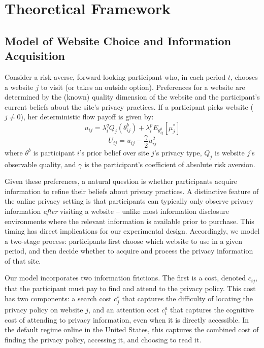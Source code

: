 \documentclass[12pt]{article}
\theoremstyle{definition}
\theoremstyle{remark}
\begin{document}

\section{Theoretical Framework}\label{sec:model_hypotheses}

\subsection{Model of Website Choice and Information Acquisition}\label{sec:participant_model}
Consider a risk-averse, forward-looking participant who, in each period $t$, chooses a website $j$ to visit (or takes an outside option). Preferences for a website are determined by the (known) quality dimension of the website and the participant's current beliefs about the site's privacy practices. If a participant picks website ($j \neq 0$), her deterministic flow payoff is given by:
\begin{equation}\label{eq:utility}
    u_{ij} = \lambda^q_i Q_j(\theta^b_{ij}) + \lambda^p_i E_{\theta^b_{ij}}[\mu^*_j]
\end{equation}
\begin{equation}
    U_{ij} = u_{ij} - \frac{\gamma}{2} u^2_{ij}
\end{equation}
where $\theta^b$ is participant $i$'s prior belief over site $j$'s privacy type, $Q_j$ is website $j$'s observable quality, and $\gamma$ is the participant's coefficient of absolute risk aversion.
 
Given these preferences, a natural question is whether participants acquire information to refine their beliefs about privacy practices. A distinctive feature of the online privacy setting is that participants can typically only observe privacy information \emph{after} visiting a website -- unlike most information disclosure environments where the relevant information is available prior to purchase. This timing has direct implications for our experimental design. Accordingly, we model a two-stage process: participants first choose which website to use in a given period, and then decide whether to acquire and process the privacy information of that site.

Our model incorporates two information frictions. The first is a cost, denoted $c_{ij}$, that the participant must pay to find and attend to the privacy policy. This cost has two components: a search cost $c^s_j$ that captures the difficulty of locating the privacy policy on website $j$, and an attention cost $c^a_i$ that captures the cognitive cost of attending to privacy information, even when it is directly accessible. In the default regime online in the United States, this captures the combined cost of finding the privacy policy, accessing it, and choosing to read it.
 
\end{document}
